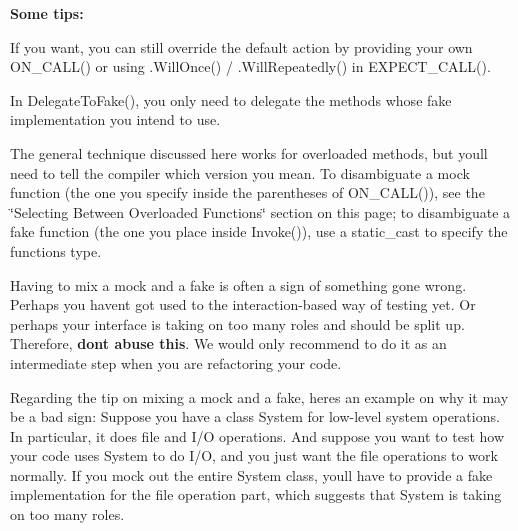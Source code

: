\begin{DoxyCode}{0}
\DoxyCodeLine{}
\DoxyCodeLine{}
\DoxyCodeLine{}
\DoxyCodeLine{}
\DoxyCodeLine{\}}
\end{DoxyCode}


{\bfseries{Some tips\+:}}


\begin{DoxyItemize}
\item If you want, you can still override the default action by providing your own {\ttfamily O\+N\+\_\+\+C\+A\+L\+L()} or using {\ttfamily .Will\+Once()} / {\ttfamily .Will\+Repeatedly()} in {\ttfamily E\+X\+P\+E\+C\+T\+\_\+\+C\+A\+L\+L()}.
\item In {\ttfamily Delegate\+To\+Fake()}, you only need to delegate the methods whose fake implementation you intend to use.
\item The general technique discussed here works for overloaded methods, but you\textquotesingle{}ll need to tell the compiler which version you mean. To disambiguate a mock function (the one you specify inside the parentheses of {\ttfamily O\+N\+\_\+\+C\+A\+L\+L()}), see the \char`\"{}\+Selecting Between Overloaded Functions\char`\"{} section on this page; to disambiguate a fake function (the one you place inside {\ttfamily Invoke()}), use a {\ttfamily static\+\_\+cast} to specify the function\textquotesingle{}s type.
\item Having to mix a mock and a fake is often a sign of something gone wrong. Perhaps you haven\textquotesingle{}t got used to the interaction-\/based way of testing yet. Or perhaps your interface is taking on too many roles and should be split up. Therefore, {\bfseries{don\textquotesingle{}t abuse this}}. We would only recommend to do it as an intermediate step when you are refactoring your code.
\end{DoxyItemize}

Regarding the tip on mixing a mock and a fake, here\textquotesingle{}s an example on why it may be a bad sign\+: Suppose you have a class {\ttfamily System} for low-\/level system operations. In particular, it does file and I/O operations. And suppose you want to test how your code uses {\ttfamily System} to do I/O, and you just want the file operations to work normally. If you mock out the entire {\ttfamily System} class, you\textquotesingle{}ll have to provide a fake implementation for the file operation part, which suggests that {\ttfamily System} is taking on too many roles.

